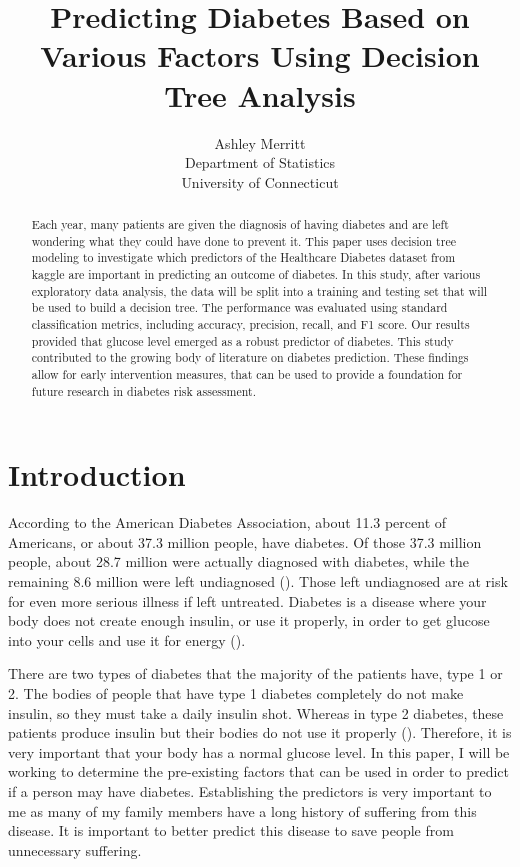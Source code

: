 \documentclass[12pt]{article}
\title{Predicting Diabetes Based on Various Factors Using Decision Tree Analysis}
\author{Ashley Merritt\\
    Department of Statistics\\
    University of Connecticut
    }
\begin{document}
\maketitle

\begin{abstract}
Each year, many patients are given the diagnosis of having diabetes and are left wondering what they could have done to prevent it. This
paper uses decision tree modeling to investigate which predictors of the Healthcare Diabetes dataset from kaggle are important in predicting 
an outcome of diabetes. In this study, after various exploratory data analysis, the data will be split into a training and testing set
that will be used to build a decision tree. The performance was evaluated using standard classification metrics, including accuracy, precision, 
recall, and F1 score. Our results provided that glucose level emerged as a robust predictor of diabetes. This study contributed to the growing body of
literature on diabetes prediction. These findings allow for early intervention measures, that can be used to provide a foundation for future research in diabetes
risk assessment.
\end{abstract}

\section{Introduction}
\label{sec:intro}
    According to the American Diabetes Association, about 11.3 percent of Americans, or about 37.3 million people, have diabetes.
    Of those 37.3 million people, about 28.7 million were actually diagnosed with diabetes, while the remaining 8.6 million were
    left undiagnosed (\citet{CDC2022Diabetes}). Those left undiagnosed are at risk for even more serious illness if left untreated. 
    Diabetes is a disease where your body does not create enough insulin, or use it properly, in order to get glucose into your cells 
    and use it for energy (\cite{NIH2023Whatis}).
    
    There are two types of diabetes that the majority of the patients have, type 1 or 2. The bodies of people that have type 1 diabetes
    completely do not make insulin, so they must take a daily insulin shot. Whereas in type 2 diabetes, these patients produce insulin but 
    their bodies do not use it properly (\cite{JDC2023Difference}). Therefore, it is very important that your body has a normal glucose level.
    In this paper, I will be working to determine the pre-existing factors that can be used in order to predict if a person may have diabetes. 
    Establishing the predictors is very important to me as many of my family members have a long history of suffering from this disease. 
    It is important to better predict this disease to save people from unnecessary suffering. 
\end{document}
